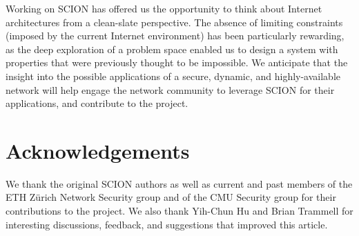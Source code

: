 \documentclass[a4paper]{llncs}
\newcommand\SCION{{\small\textsf{SCION}}\xspace}
\begin{document}
Working on \SCION has offered us the opportunity to think about Internet
architectures from a clean-slate perspective. 
The absence of limiting constraints (imposed by the current Internet
environment) has been particularly rewarding, as the deep exploration of a
problem space enabled us to design a system with properties that were
previously thought to be impossible. 
We anticipate that the insight into the possible applications of a secure,
dynamic, and highly-available network will help engage the network community to
leverage \SCION for their applications, and contribute to the project.


 

\section*{Acknowledgements}

We thank the original \SCION authors as well as current and past members of the
ETH Z\"{u}rich Network Security group and of the CMU Security group for their
contributions to the project. We also thank Yih-Chun Hu and Brian Trammell for interesting
discussions, feedback, and suggestions that improved this article.
 



\end{document}
